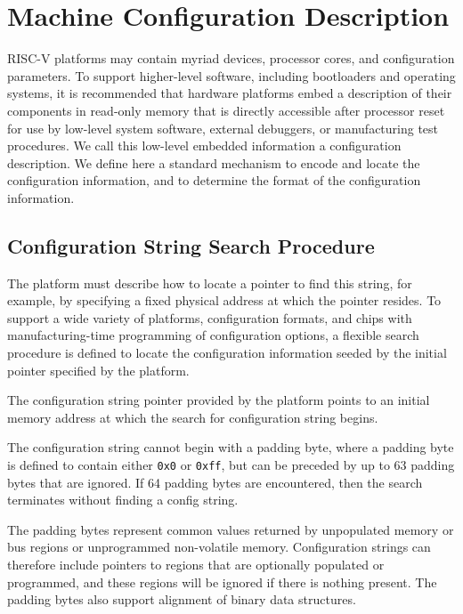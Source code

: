 \chapter{Machine Configuration Description}
\label{cfgstr}

RISC-V platforms may contain myriad devices, processor cores, and
configuration parameters.  To support higher-level software, including
bootloaders and operating systems, it is recommended that hardware
platforms embed a description of their components in read-only memory
that is directly accessible after processor reset for use by low-level
system software, external debuggers, or manufacturing test procedures.
We call this low-level embedded information a configuration
description.  We define here a standard mechanism to encode and locate
the configuration information, and to determine the format of the
configuration information.

\section{Configuration String Search Procedure}

The platform must describe how to locate a pointer to find this
string, for example, by specifying a fixed physical address at which
the pointer resides.  To support a wide variety of platforms,
configuration formats, and chips with manufacturing-time programming
of configuration options, a flexible search procedure is defined to
locate the configuration information seeded by the initial pointer
specified by the platform.

The configuration string pointer provided by the platform points to an
initial memory address at which the search for configuration string
begins.

The configuration string cannot begin with a padding byte, where a
padding byte is defined to contain either {\tt 0x0} or {\tt 0xff}, but
can be preceded by up to 63 padding bytes that are ignored.  If 64
padding bytes are encountered, then the search terminates without
finding a config string.

\begin{commentary}
The padding bytes represent common values returned by unpopulated
memory or bus regions or unprogrammed non-volatile
memory. Configuration strings can therefore include pointers to
regions that are optionally populated or programmed, and these regions
will be ignored if there is nothing present.  The padding bytes also
support alignment of binary data structures.
\end{commentary}

